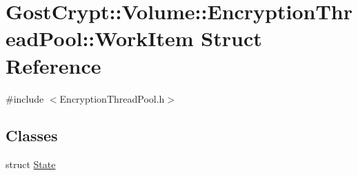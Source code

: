 \hypertarget{struct_gost_crypt_1_1_volume_1_1_encryption_thread_pool_1_1_work_item}{}\section{Gost\+Crypt\+:\+:Volume\+:\+:Encryption\+Thread\+Pool\+:\+:Work\+Item Struct Reference}
\label{struct_gost_crypt_1_1_volume_1_1_encryption_thread_pool_1_1_work_item}


{\ttfamily \#include $<$Encryption\+Thread\+Pool.\+h$>$}

\subsection*{Classes}
\begin{DoxyCompactItemize}
\item 
struct \hyperlink{struct_gost_crypt_1_1_volume_1_1_encryption_thread_pool_1_1_work_item_1_1_state}{State}
\end{DoxyCompactItemize}
